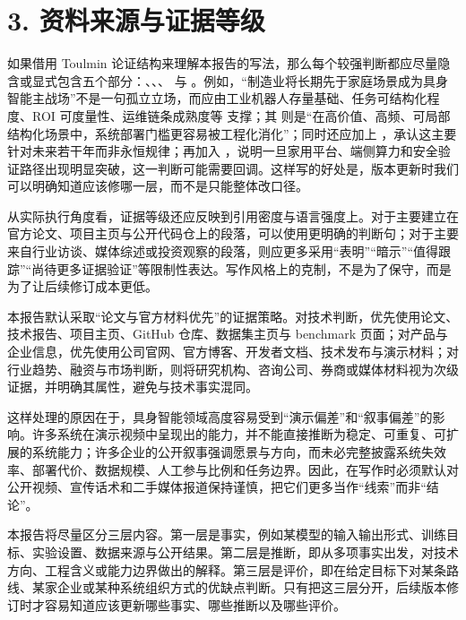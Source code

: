 \section*{3. 资料来源与证据等级}

如果借用 Toulmin 论证结构来理解本报告的写法，那么每个较强判断都应尽量隐含或显式包含五个部分：\texttt{}、\texttt{}、\texttt{}、\texttt{} 与 \texttt{}。例如，“制造业将长期先于家庭场景成为具身智能主战场”不是一句孤立立场，而应由工业机器人存量基础、任务可结构化程度、ROI 可度量性、运维链条成熟度等 \texttt{} 支撑；其 \texttt{} 则是“在高价值、高频、可局部结构化场景中，系统部署门槛更容易被工程化消化”；同时还应加上 \texttt{}，承认这主要针对未来若干年而非永恒规律；再加入 \texttt{}，说明一旦家用平台、端侧算力和安全验证路径出现明显突破，这一判断可能需要回调。这样写的好处是，版本更新时我们可以明确知道应该修哪一层，而不是只能整体改口径。

从实际执行角度看，证据等级还应反映到引用密度与语言强度上。对于主要建立在官方论文、项目主页与公开代码仓上的段落，可以使用更明确的判断句；对于主要来自行业访谈、媒体综述或投资观察的段落，则应更多采用“表明”“暗示”“值得跟踪”“尚待更多证据验证”等限制性表达。写作风格上的克制，不是为了保守，而是为了让后续修订成本更低。

本报告默认采取“论文与官方材料优先”的证据策略。对技术判断，优先使用论文、技术报告、项目主页、GitHub 仓库、数据集主页与 benchmark 页面；对产品与企业信息，优先使用公司官网、官方博客、开发者文档、技术发布与演示材料；对行业趋势、融资与市场判断，则将研究机构、咨询公司、券商或媒体材料视为次级证据，并明确其属性，避免与技术事实混同。

这样处理的原因在于，具身智能领域高度容易受到“演示偏差”和“叙事偏差”的影响。许多系统在演示视频中呈现出的能力，并不能直接推断为稳定、可重复、可扩展的系统能力；许多企业的公开叙事强调愿景与方向，而未必完整披露系统失效率、部署代价、数据规模、人工参与比例和任务边界。因此，在写作时必须默认对公开视频、宣传话术和二手媒体报道保持谨慎，把它们更多当作“线索”而非“结论”。

本报告将尽量区分三层内容。第一层是事实，例如某模型的输入输出形式、训练目标、实验设置、数据来源与公开结果。第二层是推断，即从多项事实出发，对技术方向、工程含义或能力边界做出的解释。第三层是评价，即在给定目标下对某条路线、某家企业或某种系统组织方式的优缺点判断。只有把这三层分开，后续版本修订时才容易知道应该更新哪些事实、哪些推断以及哪些评价。

